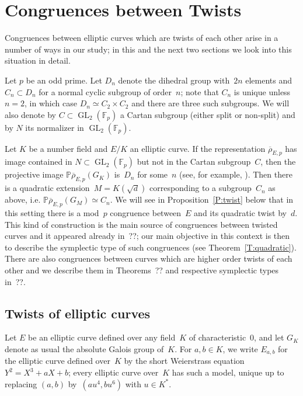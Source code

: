 \documentclass[12pt, reqno]{amsart}
\newcommand{\F}{\mathbb{F}}
\newcommand{\PP}{\mathbb{P}}
\newcommand{\rhobar}{{\overline{\rho}}}
\newcommand{\GL}{\operatorname{GL}}
\newcommand{\PGL}{\operatorname{PGL}}
\numberwithin{equation}{section}
\theoremstyle{definition}
\theoremstyle{remark}
\begin{document}
\section{Congruences between Twists}\label{S:cong-twist}

Congruences between elliptic curves which are twists of each other arise in a number of ways in our study; in this and the next two sections we look into this situation in detail.

Let $p$ be an odd prime. Let $D_{n}$ denote the dihedral group
with~$2n$ elements and $C_n \subset D_{n}$ for a normal cyclic
subgroup of order~$n$; note that $C_n$ is unique unless $n=2$, in
which case $D_{n} \simeq C_2 \times C_2$ and there are three such
subgroups.  We will also denote by $C \subset \GL_2(\F_p)$ a Cartan
subgroup (either split or non-split) and by $N$ its normalizer in
$\GL_2(\F_p)$.  



Let $K$ be a number field and $E/K$ an elliptic curve. If the
representation $\rhobar_{E,p}$ has image contained in $N \subset
\GL_2(\F_p)$ but not in the Cartan subgroup~$C$, then the projective
image $\PP \rhobar_{E,p}(G_K)$ is~$D_{n}$ for some~$n$ (see, for
example, \cite[Theorem XI.2.3]{LangModForms}). Then there is a
quadratic extension~$M = K(\sqrt{d})$ corresponding to a
subgroup~$C_n$ as above, i.e. $\PP \rhobar_{E,p}(G_M) \simeq C_n$.  We
will see in Proposition~\ref{P:twist} below that in this setting there
is a mod~$p$ congruence between~$E$ and its quadratic twist by~$d$.
This kind of construction is the main source of congruences between
twisted curves and it appeared already in~??; our main objective in
this context is then to describe the symplectic type of such
congruences (see Theorem~\ref{T:quadratic}). There are also
congruences between curves which are higher order twists of each other
and we describe them in Theorems~?? and respective symplectic types
in~??.

\subsection{Twists of elliptic curves}

Let $E$ be an elliptic curve defined over any field~$K$ of
characteristic~$0$, and let $G_K$ denote as usual the absolute Galois
group of~$K$.  For $a, b \in K$, we write $E_{a,b}$ for the elliptic
curve defined over~$K$ by the short Weierstrass equation
$Y^2=X^3+aX+b$; every elliptic curve over~$K$ has such a model, unique
up to replacing $(a,b)$ by~$(au^4,bu^6)$ with $u\in K^*$.
\end{document}
